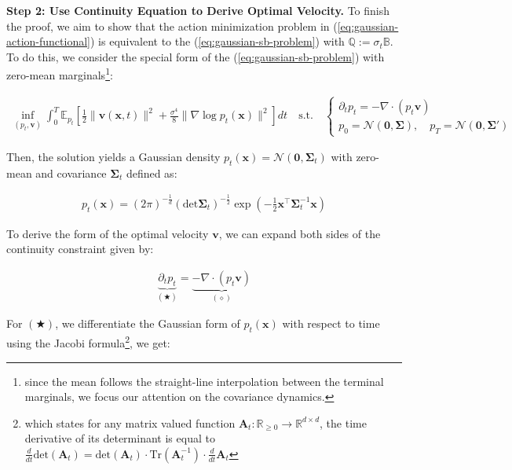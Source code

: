 \documentclass{article}
\begin{document}
\textbf{Step 2: Use Continuity Equation to Derive Optimal Velocity. }
To finish the proof, we aim to show that the action minimization problem in (\ref{eq:gaussian-action-functional}) is equivalent to the (\ref{eq:gaussian-sb-problem}) with $\mathbb{Q}:=\sigma_t\mathbb{B}$. To do this, we consider the special form of the (\ref{eq:gaussian-sb-problem}) with zero-mean marginals\footnote{since the mean follows the straight-line interpolation between the terminal marginals, we focus our attention on the covariance dynamics.}:
\begin{small}
\begin{align}
    \inf_{(p_t, \boldsymbol{v})}\int_0^T\mathbb{E}_{p_t}\left[\frac{1}{2}\|\boldsymbol{v}(\boldsymbol{x},t)\|^2+\frac{\sigma^4}{8}\|\nabla\log p_t(\boldsymbol{x})\|^2\right]dt\quad \text{s.t.}\quad \begin{cases}
        \partial_tp_t=-\nabla \cdot(p_t\boldsymbol{v})\\
        p_0=\mathcal{N}(\boldsymbol{0},\boldsymbol{\Sigma}), \quad p_T=\mathcal{N}(\boldsymbol{0},\boldsymbol{\Sigma}')
    \end{cases}\label{eq:gaus-alt-objective}
\end{align}
\end{small}
Then, the solution yields a Gaussian density $p_t(\boldsymbol{x})=\mathcal{N}(\boldsymbol{0}, \boldsymbol{\Sigma}_t)$ with zero-mean and covariance $\boldsymbol{\Sigma}_t$ defined as:
\begin{small}
\begin{align}
    p_t(\boldsymbol{x})=(2\pi)^{-\frac{1}{d}}(\text{det}\boldsymbol{\Sigma}_t)^{-\frac{1}{2}}\exp\left(-\frac{1}{2}\boldsymbol{x}^\top\boldsymbol{\Sigma}_t^{-1}\boldsymbol{x}\right)
\end{align}
\end{small}
To derive the form of the optimal velocity $\boldsymbol{v}$, we can expand both sides of the continuity constraint given by:
\begin{small}
\begin{align}
    \underbrace{\partial_tp_t}_{(\bigstar)}=\underbrace{-\nabla \cdot(p_t\boldsymbol{v})}_{(\diamond)}\label{eq:gaussian-continutiy-proof}
\end{align}
\end{small}
For $(\bigstar)$, we differentiate the Gaussian form of $p_t(\boldsymbol{x})$ with respect to time using the Jacobi formula\footnote{which states for any matrix valued function $\boldsymbol{A}_t:\mathbb{R}_{\geq 0}\to \mathbb{R}^{d\times d}$, the time derivative of its determinant is equal to $\frac{d}{dt}\text{det}(\boldsymbol{A}_t)=\text{det}(\boldsymbol{A}_t)\cdot \text{Tr}(\boldsymbol{A}_t^{-1})\cdot\frac{d}{dt}\boldsymbol{A}_t$}, we get:
\end{document}
